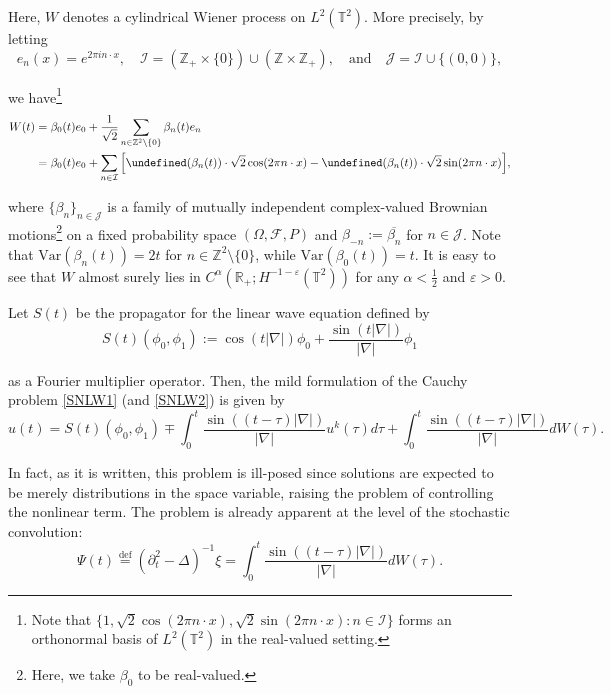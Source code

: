 \documentclass[letterpaper, 11pt,  reqno]{amsart}
\newcommand{\1}{\hspace{0.5mm}\text{I}\hspace{0.5mm}}
\newcommand{\I}{\mathcal{I}}
\newcommand{\noi}{\noindent}
\newcommand{\Z}{\mathbb{Z}}
\newcommand{\R}{\mathbb{R}}
\newcommand{\T}{\mathbb{T}}
\let\Re=\undefined\DeclareMathOperator*{\Re}{Re}
\let\Im=\undefined\DeclareMathOperator*{\Im}{Im}
\newcommand{\F}{\mathcal{F}}
\newcommand{\al}{\alpha}
\newcommand{\be}{\beta}
\newcommand{\Dl}{\Delta}
\newcommand{\eps}{\varepsilon}
\newcommand{\cj}{\overline}
\newcommand{\dt}{\partial_t}
\renewcommand{\O}{\Omega}
\numberwithin{equation}{section}
\numberwithin{theorem}{section}
\begin{document}
\noi
Here, $W$ denotes
a cylindrical Wiener process on $L^2(\T^2)$.
More precisely, by letting 
\[e_n(x) = e^{2\pi i n \cdot x}, \quad 
\I = (\Z_+\times \{0\}) \cup (\Z\times \Z_+),
\quad \text{and}\quad \mathcal{J} = \I \cup\{(0, 0)\},\]

\noi
we have\footnote{Note that $\{1, \sqrt 2\cos(2\pi n\cdot x), \sqrt 2 \sin (2\pi n \cdot x):
n \in \I \}$ forms an orthonormal basis of $L^2(\T^2)$ in the real-valued setting.}
\begin{align}
 W(t) & = \be_0(t) e_0 + \frac{1}{\sqrt 2} \sum_{n\in \Z^{2}\setminus\{0\}}
\be_n (t) e_n\notag \\
& = \be_0(t) e_0 +  \sum_{n\in \I}
\Big[\Re(\be_n (t)) \cdot \sqrt 2 \cos (2\pi n \cdot x)
- \Im(\be_n (t) )\cdot \sqrt 2 \sin (2\pi n \cdot x)\Big],
\label{Wiener1}
\end{align}

\noi
where $\{ \be_n\}_{n \in \mathcal{J}}$ is a family of  mutually independent complex-valued Brownian
motions\footnote{Here, we take $\be_0$ to be real-valued.}
on a fixed probability space $(\O, \F, P)$
and $\be_{-n} := \cj{\be_n}$ for $n \in \mathcal{J}$.
Note that $\text{Var}(\be_n(t)) = 2t$ for $n \in \Z^2 \setminus\{0\}$, 
while 
 $\text{Var}(\be_0(t)) = t$.
It is easy to see that $W$ almost surely lies in 
$C^{\al}(\R_+;H^{-1-\eps}(\T^2))$
for any $\al < \frac 12$ and $\eps > 0$.

Let $S(t)$ be the propagator for the linear wave equation
defined by 
\begin{equation*}%
S(t)(\phi_0, \phi_1):=\cos(t|\nabla|)\phi_0+\frac{\sin (t|\nabla|)}{|\nabla|}\phi_1
\end{equation*}


\noi
as a Fourier multiplier operator.
Then, the mild formulation 
of the Cauchy problem \eqref{SNLW1} (and \eqref{SNLW2})
is given by 
\begin{equation*}
u(t)=S(t)(\phi_0, \phi_1)
\mp \int_{0}^t \frac{\sin ((t-\tau)|\nabla|)}{|\nabla|}u^k(\tau)d\tau
+ \int_{0}^t \frac{\sin ((t-\tau)|\nabla|)}{|\nabla|}dW(\tau).
\end{equation*}
	
\noi
In fact, as it is written, this problem is ill-posed since solutions are expected to be merely distributions in the space variable, raising the problem of controlling the nonlinear term. The problem is already apparent at the level of  the stochastic convolution: 
\begin{equation}
\Psi(t) \stackrel{\text{def}}{=} 
(\dt^2 - \Dl)^{-1} \xi
=  \int_{0}^t \frac{\sin ((t-\tau)|\nabla|)}{|\nabla|}dW(\tau).
\label{sconv1}
\end{equation}
\end{document}
